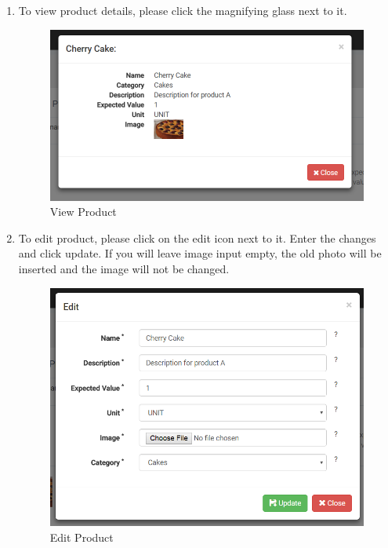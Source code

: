 \documentclass[a4paper,11pt,twoside]{report}
\theoremstyle{definition}
\begin{document}
\begin{enumerate}
\begin{enumerate}
\item To view product details, please click the magnifying glass next to it.

\begin{figure}[h!]
\begin{center}
\includegraphics[width=\textwidth]{AS/product/5}
\end{center}
\caption{View Product}
\end{figure}
\thispagestyle{empty}


\item To edit product, please click on the edit icon next to it. Enter the changes and click update. If you will leave image input empty, the old photo will be inserted and the image will not be changed.

\begin{figure}[h!]
\begin{center}
\includegraphics[width=\textwidth]{AS/product/6}
\end{center}
\caption{Edit Product}
\end{figure}
\thispagestyle{empty}


\end{enumerate}
\end{enumerate}
\end{document}
